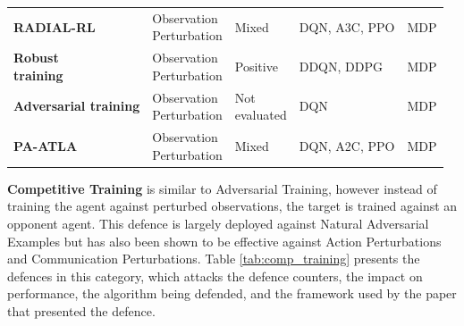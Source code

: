 \documentclass[conference,compsoc]{IEEEtran}
\begin{document}
\begin{table}[ht]
{\begin{tabular}{ p{2.0cm} p{2.0cm} p{1.7cm} p{1.3cm} l }
\textbf{RADIAL-RL \cite{oikarinen_robust_2021}}                      & \makecell[lt]{Observation \\ Perturbation}     & Mixed                          & DQN, A3C, PPO              & MDP         \\ 
\makecell[lt]{\textbf{Robust} \\ \textbf{training \cite{pattanaik_robust_2018}}}                                          & \makecell[lt]{Observation \\ Perturbation}     & Positive                       & DDQN, DDPG                 & MDP         \\ 
\textbf{Adversarial training \cite{behzadan_whatever_2017}}                                     & \makecell[lt]{Observation \\ Perturbation}     & \makecell[lt]{Not \\ evaluated}                  & DQN                        & MDP         \\ 
\textbf{PA-ATLA \cite{sun_who_2021}}                                                  & \makecell[lt]{Observation \\ Perturbation}     & Mixed                          & DQN, A2C, PPO              & MDP         \\
\hline
\end{tabular}
}
\label{tab:adv_training}
\end{table}

\noindent \textbf{Competitive Training}
is similar to Adversarial Training, however instead of training the agent against perturbed observations, the target is trained against an opponent agent. This defence is largely deployed against Natural Adversarial Examples but has also been shown to be effective against Action Perturbations and Communication Perturbations. Table \ref{tab:comp_training} presents the defences in this category, which attacks the defence counters, the impact on performance, the algorithm being defended, and the framework used by the paper that presented the defence.
\end{document}
